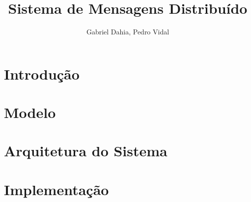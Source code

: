 \documentclass{article}
\title{Sistema de Mensagens Distribuído}
\author{Gabriel Dahia, Pedro Vidal}
\begin{document}
 
\maketitle
 
\section{Introdução} \label{sec:intro}
 


\section{Modelo} \label{sec:model}
 


\section{Arquitetura do Sistema} \label{sec:arc}



\section{Implementação} \label{sec:impl}




 
\end{document}
